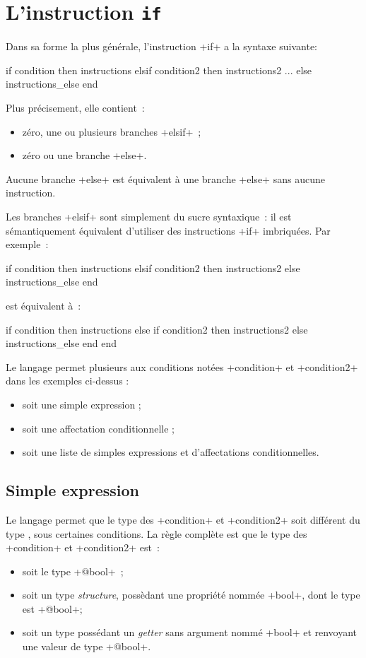 \section{L'instruction \texttt{if}}


Dans sa forme la plus générale, l'instruction \ggst+if+ a la syntaxe suivante:

\begin{galgas3box}
if condition then
  instructions
elsif condition2 then
  instructions2
...
else
  instructions_else
end
\end{galgas3box}


Plus précisement, elle contient~:
\begin{itemize}
\item zéro, une ou plusieurs branches \ggst+elsif+~;
\item zéro ou une branche \ggst+else+.
\end{itemize}


Aucune branche \ggst+else+ est équivalent à une branche \ggst+else+ sans aucune instruction.


Les branches \ggst+elsif+ sont simplement du sucre syntaxique~: il est sémantiquement équivalent d'utiliser des instructions \ggst+if+ imbriquées. Par exemple~:
\begin{galgas3}
if condition then
  instructions
elsif condition2 then
  instructions2
else
  instructions_else
end
\end{galgas3}

est équivalent à~:
\begin{galgas3}
if condition then
  instructions
else
  if condition2 then
    instructions2
  else
    instructions_else
  end
end
\end{galgas3}

Le langage permet plusieurs aux conditions notées \ggst+condition+ et \ggst+condition2+ dans les exemples ci-dessus :
\begin{itemize}
  \item soit une simple expression ;
  \item soit une affectation conditionnelle ;
  \item soit une liste de simples expressions et d'affectations conditionnelles.
\end{itemize}


\subsection{Simple expression}
Le langage permet que le type des \ggst+condition+ et \ggst+condition2+ soit différent du type , sous certaines conditions. La règle complète est que le type des \ggst+condition+ et \ggst+condition2+ est~:
\begin{itemize}
\item soit le type \ggst+@bool+~;
\item soit un type \emph{structure}, possèdant une propriété nommée \ggst+bool+, dont le type est \ggst+@bool+;
\item soit un type possédant un \emph{getter} sans argument nommé \ggst+bool+ et renvoyant une valeur de type \ggst+@bool+.
\end{itemize}

